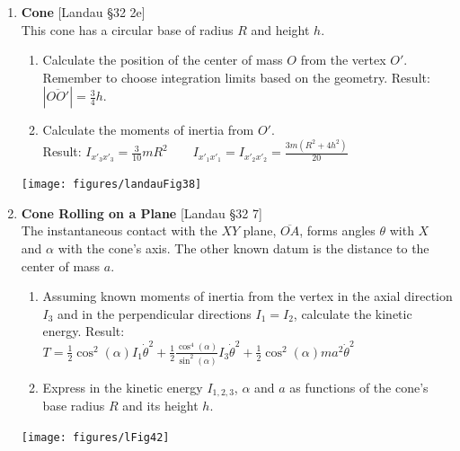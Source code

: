 \documentclass[11pt, a4paper, twoside]{article}
\begin{document}
\begin{enumerate}
	\item 
		\begin{minipage}[t][3.5cm]{0.72\textwidth}
			\textbf{Cone} [Landau \S 32 2e]\\
			This cone has a circular base of radius \(R\) and height \(h\).
			 \begin{enumerate}
				\item Calculate the position of the center of mass \(O\) from the vertex \(O'\).
				Remember to choose integration limits based on the geometry.
				Result: \(|\overline{O O'}| = \frac{3}{4} h\).
				\item Calculate the moments of inertia from \(O'\).\\
				Result: \(I_{x'_3 x'_3} = \frac{3}{10} m R^{2} \qquad I_{x'_1 x'_1} = I_{x'_2 x'_2} = \frac{3 m \left(R^{2} + 4 h^{2}\right)}{20}\)
			\end{enumerate}
			\end{minipage}
			\begin{minipage}[c][1cm][t]{0.2\textwidth}
			\texttt{[image: figures/landauFig38]}
		\end{minipage}

	\newpage

	\item 
		\begin{minipage}[t][3.5cm]{0.53\textwidth}
			\textbf{Cone Rolling on a Plane} [Landau \S 32 7]\\
				 The instantaneous contact with the \(X Y\) plane, \(\overline{O A}\), forms angles \(\theta\) with \(X\) and \(\alpha\) with the cone's axis.
				 The other known datum is the distance to the center of mass \(a\).
				\begin{enumerate}
					\item Assuming known moments of inertia from the vertex in the axial direction \(I_3\) and in the perpendicular directions \(I_1 = I_2\), calculate the kinetic energy.
					Result:\\
					\(T = \frac{1}{2} \cos^2(\alpha) I_1 \dot{\theta}^{2} + \frac{1}{2} \frac{\cos^4(\alpha)}{\sin^2(\alpha)} I_3  \dot{\theta}^{2} + \frac{1}{2} \cos^2(\alpha) m a^{2} \dot{\theta}^{2} \)
					\item Express in the kinetic energy \(I_{1,2,3}\), \(\alpha\) and \(a\) as functions of the cone's base radius \(R\) and its height \(h\).
				\end{enumerate}
		\end{minipage}
		\begin{minipage}[c][0cm][t]{0.4\textwidth}
			\texttt{[image: figures/lFig42]}
		\end{minipage}

\end{enumerate}
\end{document}
